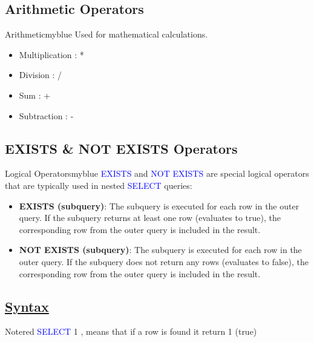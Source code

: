 \subsection{Arithmetic Operators}
\begin{prettyBox}{Arithmetic}{myblue}
Used for mathematical calculations.
    \begin{itemize} 
           \item Multiplication : *
           \item Division : / 
           \item Sum : + 
           \item Subtraction : -
           \end{itemize}
\end{prettyBox}

\vspace{0.25cm}

\subsection{EXISTS \& NOT EXISTS Operators}
\begin{prettyBox}{Logical Operators}{myblue}
    \textcolor{blue}{EXISTS} and \textcolor{blue}{NOT EXISTS} are special logical operators that are typically used in nested \textcolor{blue}{SELECT} queries:
    \begin{itemize}
    \item \textbf{EXISTS (subquery)}: 
    The subquery is executed for each row in the outer query. If the subquery returns at least one row (evaluates to true), the corresponding row from the outer query is included in the result.

    \item \textbf{NOT EXISTS (subquery)}: 
    The subquery is executed for each row in the outer query. If the subquery does not return any rows (evaluates to false), the corresponding row from the outer query is included in the result.
\end{itemize}
\end{prettyBox}
\vspace{0.15cm}
\subsection*{\underline{Syntax}}


\vspace{0.25cm}

\begin{prettyBox}{Note}{red}
    \textcolor{blue}{SELECT} 1 , means that if a row is found it return 1 (true)
\end{prettyBox}


